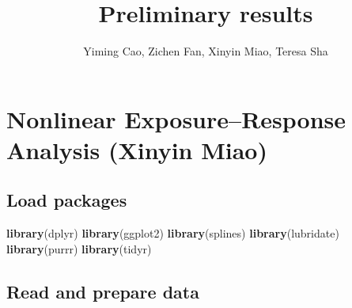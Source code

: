 \documentclass[
]{article}
\title{Preliminary results}
\author{Yiming Cao, Zichen Fan, Xinyin Miao, Teresa Sha}
\date{}
\newenvironment{Shaded}{\begin{snugshade}}{\end{snugshade}}
\newcommand{\FunctionTok}[1]{\textcolor[rgb]{0.13,0.29,0.53}{\textbf{#1}}}
\newcommand{\NormalTok}[1]{#1}
\begin{document}
\maketitle

\section{Nonlinear Exposure--Response Analysis (Xinyin
Miao)}\label{nonlinear-exposureresponse-analysis-xinyin-miao}

\subsection{Load packages}\label{load-packages}

\begin{Shaded}
\begin{Highlighting}[]
\FunctionTok{library}\NormalTok{(dplyr)}
\FunctionTok{library}\NormalTok{(ggplot2)}
\FunctionTok{library}\NormalTok{(splines)}
\FunctionTok{library}\NormalTok{(lubridate)}
\FunctionTok{library}\NormalTok{(purrr)}
\FunctionTok{library}\NormalTok{(tidyr)}
\end{Highlighting}
\end{Shaded}

\subsection{Read and prepare data}\label{read-and-prepare-data}
\end{document}
